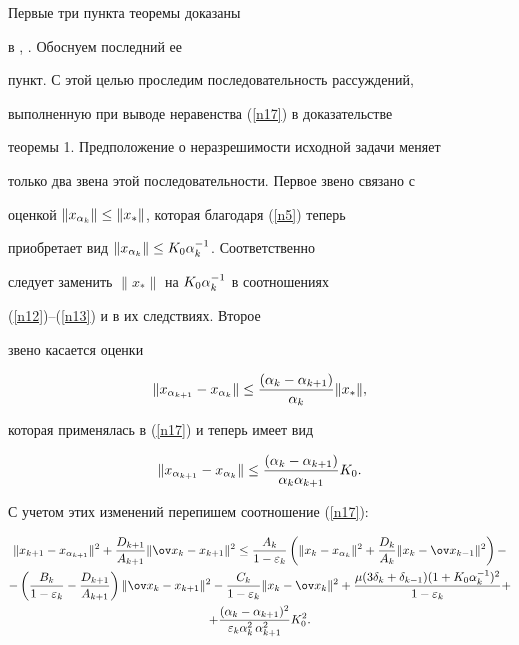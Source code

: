 \begin{pf}


Первые три пункта теоремы доказаны


в \cite{kokur}, \cite{ppf3}. Обоснуем последний ее


пункт. С этой целью проследим последовательность рассуждений,


выполненную при выводе неравенства (\ref{n17}) в доказательстве


теоремы 1. Предположение о неразрешимости исходной задачи меняет


только два звена этой последовательности. Первое звено связано с


оценкой $\|x_{\alpha_k}\|\leq\|x_*\|$, которая благодаря (\ref{n5}) теперь


приобретает вид $\|x_{\alpha_k}\|\leq K_0\alpha_k^{-1}$. Соответственно


следует заменить $\|x_*\|$ на $K_0\alpha_k^{-1}$ в соотношениях


(\ref{n12})--(\ref{n13}) и в их следствиях. Второе


звено касается оценки


$$


\|\xakk-\xak\|\leq \frac{ (\ak-\akk)}{ \ak}\|x_*\|,


$$


которая применялась в (\ref{n17}) и теперь имеет вид


$$


\|\xakk-\xak\|\leq \frac{ (\ak-\akk)}{ \ak\akk}K_0.


$$


С учетом этих изменений перепишем соотношение (\ref{n17}):


\begin{multline}\label{n17a}


\DDD^2+\frac{ D_{k+1}}{ A_{k+1}}\Ax^2\leq


\frac{ A_k}{ 1-\eps_k}


\left( \D^2+\frac{ D_k}{ A_k}\Cx^2 \right) -\\


- \left( \frac{ B_k}{ 1-\eps_k}-


\frac{ D_{k+1}}{ A_{k+1}}\right)


\Ax^2-\frac{ C_k}{ 1-\eps_k}\Bx^2+


\frac{ \mu(3\dk+\dkk)(1+K_0\ak^{-1})^2}{ 1-\eps_k}+ \\


+\frac{ (\ak-\akk)^2}{ \eps_k\ak^2\,\akk^2} K_0^2.


\end{multline}



\end{pf}
